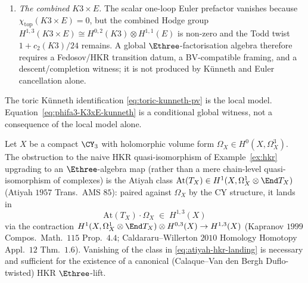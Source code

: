 \begin{remark}
\begin{enumerate}[label=(\roman*),leftmargin=1.5em]
 \item \emph{The combined $K3 \times E$.} The scalar one-loop Euler
 prefactor vanishes because $\chi_{\mathrm{top}}(K3\times E)=0$, but
 the combined Hodge group
 $H^{1,3}(K3\times E)\cong
 H^{0,2}(K3)\otimes H^{1,1}(E)$ is non-zero and the Todd twist
 $1+c_2(K3)/24$ remains.  A global $\Ethree$-factorisation algebra
 therefore requires a Fedosov/HKR transition datum, a BV-compatible
 framing, and a descent/completion witness; it is not produced by
 K\"unneth and Euler cancellation alone.
\end{enumerate}
The toric K\"unneth identification \eqref{eq:toric-kunneth-pv} is the
local model.  Equation~\eqref{eq:phifa3-K3xE-kunneth} is a conditional
global witness, not a consequence of the local model alone.
\end{remark}

\begin{theorem}
\label{thm:atiyah-obstruction-hkr-cy3}
Let $X$ be a compact $\CY_3$ with holomorphic volume form
$\Omega_X\in H^0(X,\Omega^3_X)$. The obstruction to the naive HKR
quasi-isomorphism of Example~\ref{ex:hkr} upgrading to an
$\Ethree$-algebra map (rather than a mere chain-level
quasi-isomorphism of complexes) is the Atiyah class
$\mathrm{At}(T_X)\in H^1(X,\Omega^1_X\otimes\End T_X)$
(Atiyah $1957$ Trans.\ AMS $85$): paired against $\Omega_X$ by the
CY structure, it lands in
\begin{equation}
\label{eq:atiyah-hkr-landing}
 \mathrm{At}(T_X)\cdot\Omega_X\;\in\;H^{1,3}(X)
\end{equation}
via the contraction
$H^1(X,\Omega^1_X\otimes\End T_X)\otimes H^{0,3}(X)\to H^{1,3}(X)$
(Kapranov $1999$ Compos.\ Math.\ $115$ Prop.~$4.4$;
Caldararu--Willerton $2010$ Homology Homotopy Appl.\ $12$ Thm.~$1.6$).
Vanishing of the class in \eqref{eq:atiyah-hkr-landing} is necessary
and sufficient for the existence of a canonical (Calaque--Van den Bergh
Duflo-twisted) HKR $\Ethree$-lift.
\end{theorem}


